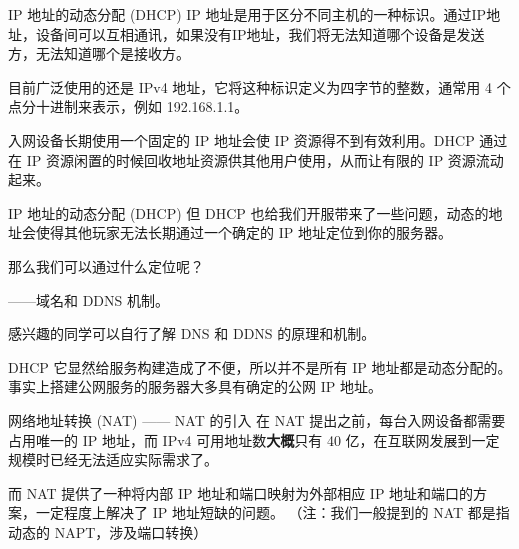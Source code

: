 \begin{xframe}{IP 地址的动态分配 (DHCP)}
	IP 地址是用于区分不同主机的一种标识。通过IP地址，设备间可以互相通讯，如果没有IP地址，我们将无法知道哪个设备是发送方，无法知道哪个是接收方。\pause
	
	目前广泛使用的还是 IPv4 地址，它将这种标识定义为四字节的整数，通常用 4 个点分十进制来表示，例如 192.168.1.1。\pause
	
	入网设备长期使用一个固定的 IP 地址会使 IP 资源得不到有效利用。DHCP 通过在 IP 资源闲置的时候回收地址资源供其他用户使用，从而让有限的 IP 资源流动起来。
	
\end{xframe}

\begin{xframe}{IP 地址的动态分配 (DHCP)}
	但 DHCP 也给我们开服带来了一些问题，动态的地址会使得其他玩家无法长期通过一个确定的 IP 地址定位到你的服务器。\pause
	
	那么我们可以通过什么定位呢？\pause
	
	——域名和 DDNS 机制。
	
	感兴趣的同学可以自行了解 DNS 和 DDNS 的原理和机制。\pause

	DHCP 它显然给服务构建造成了不便，所以并不是所有 IP 地址都是动态分配的。事实上搭建公网服务的服务器大多具有确定的公网 IP 地址。
\end{xframe}

\begin{xframe}{网络地址转换 (NAT) —— NAT 的引入}
	在 NAT 提出之前，每台入网设备都需要占用唯一的 IP 地址，而 IPv4 可用地址数\textbf{大概}只有 40 亿，在互联网发展到一定规模时已经无法适应实际需求了。\pause
	
	而 NAT 提供了一种将内部 IP 地址和端口映射为外部相应 IP 地址和端口的方案，一定程度上解决了 IP 地址短缺的问题。
	（注：我们一般提到的 NAT 都是指动态的 NAPT，涉及端口转换）
	
\end{xframe}

